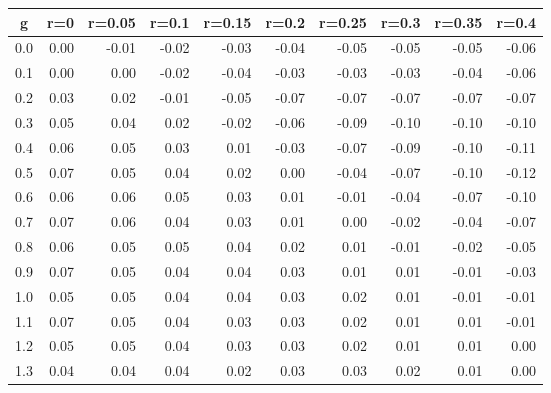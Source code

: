 %
\begin{table}[!tbp]
 \begin{center}
 \begin{tabular}{rrrrrrrrrr}\hline\hline
\multicolumn{1}{c}{g}&\multicolumn{1}{c}{r=0}&\multicolumn{1}{c}{r=0.05}&\multicolumn{1}{c}{r=0.1}&\multicolumn{1}{c}{r=0.15}&\multicolumn{1}{c}{r=0.2}&\multicolumn{1}{c}{r=0.25}&\multicolumn{1}{c}{r=0.3}&\multicolumn{1}{c}{r=0.35}&\multicolumn{1}{c}{r=0.4}\tabularnewline
\hline
0.0&0.00&-0.01&-0.02&-0.03&-0.04&-0.05&-0.05&-0.05&-0.06\tabularnewline
0.1&0.00& 0.00&-0.02&-0.04&-0.03&-0.03&-0.03&-0.04&-0.06\tabularnewline
0.2&0.03& 0.02&-0.01&-0.05&-0.07&-0.07&-0.07&-0.07&-0.07\tabularnewline
0.3&0.05& 0.04& 0.02&-0.02&-0.06&-0.09&-0.10&-0.10&-0.10\tabularnewline
0.4&0.06& 0.05& 0.03& 0.01&-0.03&-0.07&-0.09&-0.10&-0.11\tabularnewline
0.5&0.07& 0.05& 0.04& 0.02& 0.00&-0.04&-0.07&-0.10&-0.12\tabularnewline
0.6&0.06& 0.06& 0.05& 0.03& 0.01&-0.01&-0.04&-0.07&-0.10\tabularnewline
0.7&0.07& 0.06& 0.04& 0.03& 0.01& 0.00&-0.02&-0.04&-0.07\tabularnewline
0.8&0.06& 0.05& 0.05& 0.04& 0.02& 0.01&-0.01&-0.02&-0.05\tabularnewline
0.9&0.07& 0.05& 0.04& 0.04& 0.03& 0.01& 0.01&-0.01&-0.03\tabularnewline
1.0&0.05& 0.05& 0.04& 0.04& 0.03& 0.02& 0.01&-0.01&-0.01\tabularnewline
1.1&0.07& 0.05& 0.04& 0.03& 0.03& 0.02& 0.01& 0.01&-0.01\tabularnewline
1.2&0.05& 0.05& 0.04& 0.03& 0.03& 0.02& 0.01& 0.01& 0.00\tabularnewline
1.3&0.04& 0.04& 0.04& 0.02& 0.03& 0.03& 0.02& 0.01& 0.00\tabularnewline
\hline
\end{tabular}

\end{center}

\end{table}

